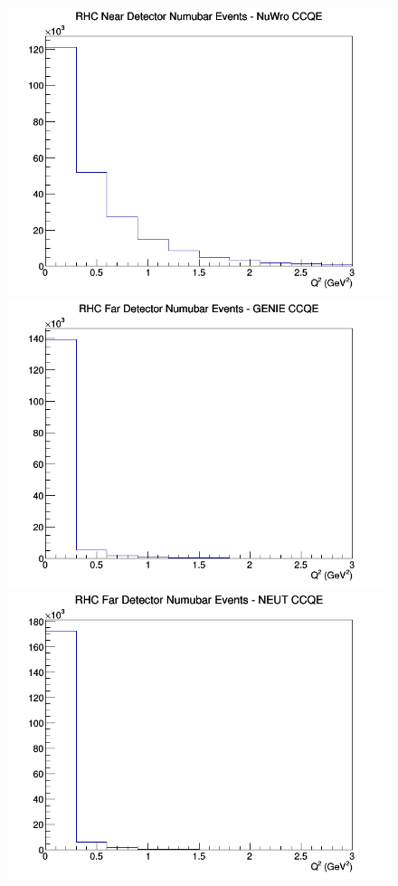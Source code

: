 \begin{figure}[h]
\includegraphics[width=\linewidth]{eff_Q2/LAr/CCQE_RHC_ND_numubar_Q2_NuWro.png}
\endminipage
\newline
{}
\includegraphics[width=\linewidth]{eff_Q2/LAr/CCQE_RHC_FD_numubar_Q2_GENIE.png}
\endminipage
{}
\includegraphics[width=\linewidth]{eff_Q2/LAr/CCQE_RHC_FD_numubar_Q2_NEUT.png}

\end{figure}
